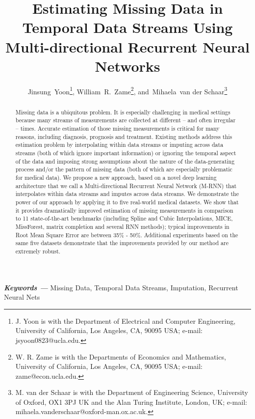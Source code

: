 \documentclass{article}
\providecommand{\keywords}[1]{\textbf{\textit{Keywords ---}} #1}
\begin{document}
\title{Estimating Missing Data in Temporal Data Streams Using Multi-directional Recurrent Neural Networks }


    \author{Jinsung~Yoon\thanks{J. Yoon is with the Department of Electrical and Computer Engineering, University of California, Los Angeles, CA, 90095 USA; e-mail: jsyoon0823@ucla.edu.}, William~R.~Zame\thanks{W. R. Zame is with the Departments of Economics and Mathematics, University of California, Los Angeles, CA, 90095 USA; e-mail: zame@econ.ucla.edu.}, and~Mihaela~van der Schaar\thanks{M. van der Schaar is with the Department of Engineering Science, University of Oxford, OX1 3PJ UK and the Alan Turing Institute, London, UK; e-mail: mihaela.vanderschaar@oxford-man.ox.ac.uk.}
}
    
    \date{}
    
\maketitle
    
\begin{abstract} 
    Missing data is a ubiquitous problem.  It is especially challenging in  medical settings because many streams of measurements are collected at different -- and often irregular -- times.   Accurate estimation of those missing measurements is critical for many reasons, including  diagnosis, prognosis and treatment. Existing methods address this estimation problem  by interpolating within data streams or imputing across data streams (both of which ignore important information) or ignoring the temporal aspect of the data and imposing strong assumptions about the nature of the data-generating process and/or the pattern of missing data (both of which are especially problematic for medical data). We propose a new approach, based on a novel deep learning architecture that we call a Multi-directional Recurrent Neural Network (M-RNN) that interpolates within data streams and imputes across data streams. We demonstrate the power of our approach by applying it to five real-world medical datasets. We show that it provides dramatically improved estimation of missing measurements in comparison to 11 state-of-the-art benchmarks (including Spline and Cubic Interpolations, MICE, MissForest, matrix completion and several RNN methods); typical improvements in Root Mean Square Error are between 35\% - 50\%. Additional experiments based on the same five datasets demonstrate that the improvements provided by our method are extremely robust.    \end{abstract}
    \small{
    \keywords{Missing Data, Temporal Data Streams, Imputation, Recurrent Neural Nets}
    }
\end{document}
